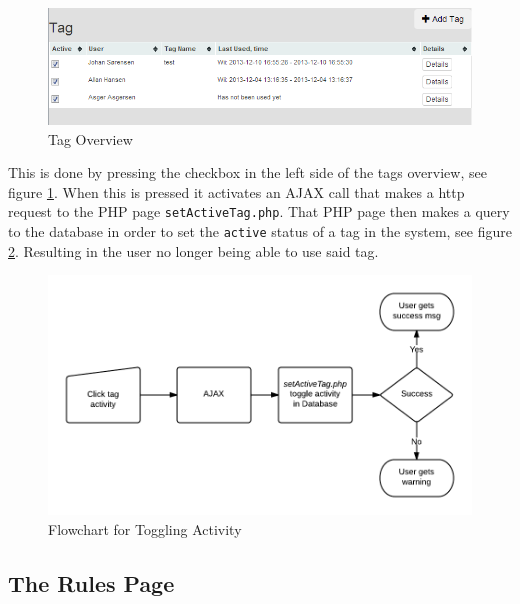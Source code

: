 \begin{figure}[htbp]
	\centering
		\includegraphics[width=1.00\textwidth]{images/tagOverview.PNG}
	\caption{Tag Overview}
	\label{fig:tagOverview}
\end{figure}

This is done by pressing the checkbox in the left side of the tags overview, see figure \ref{fig:tagOverview}. When this is pressed it activates an AJAX call that makes a http request to the PHP page \texttt{setActiveTag.php}. That PHP page then makes a query to the database in order to set the \texttt{active} status of a tag in the system, see figure \ref{fig:flowChartTagActivity}. Resulting in the user no longer being able to use said tag.


\begin{figure}[htbp]
	\centering
		\includegraphics[width=1.00\textwidth]{images/flowChartTagActivity.png}
	\caption{Flowchart for Toggling Activity}
	\label{fig:flowChartTagActivity}
\end{figure}


\subsection{The Rules Page}
